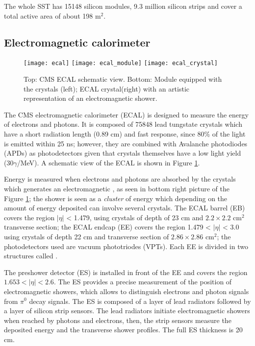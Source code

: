 The whole SST has 15148 silicon modules, 9.3 million silicon strips and cover a total active area of about 198 m$^2$. 

\subsection{Electromagnetic calorimeter}
\begin{figure}[h!]
  \centering
  \texttt{[image: ecal]}
  \texttt{[image: ecal\_module]}
  \texttt{[image: ecal\_crystal]} 
  \caption[CMS ECAL schematic view]{Top: CMS ECAL schematic view. Bottom: Module equipped with the crystals (left); ECAL crystal(right) with an artistic representation of an electromagnetic shower\cite{cms}.}
  \label{fig:ecal}
\end{figure}

The CMS electromagnetic calorimeter (ECAL) is designed to measure the energy of electrons and photons. It is composed of 75848 lead tungstate crystals which have a short radiation length (0.89 cm) and fast response, since 80\% of the light is emitted within 25 ns; however, they are combined with Avalanche photodiodes (APDs) as photodetectors given that crystals themselves have a low light yield (30$\gamma$/MeV). A schematic view of the ECAL is shown in Figure \ref{fig:ecal}.

Energy is measured when electrons and photons are absorbed by the crystals which generates an electromagnetic , as seen in bottom right picture of the Figure \ref{fig:ecal}; the shower is seen as a \textit{cluster} of energy which depending on the amount of energy deposited can involve several crystals. The ECAL barrel (EB) covers the region $|\eta|$ < 1.479, using crystals of depth of 23 cm and  $2.2\times 2.2$ cm$^2$ transverse section; the ECAL endcap (EE) covers the region 1.479 < $|\eta|$ < 3.0 using crystals of depth 22 cm and transverse section of $2.86\times2.86$ cm$^2$; the photodetectors used are vacuum phototriodes (VPTs). Each EE is divided in two structures called .

The preshower detector (ES) is installed in front of the EE and covers the region $1.653 < |\eta| < 2.6$. The ES provides a precise measurement of the position of electromagnetic showers, which allows to distinguish electrons and photon signals from $\pi^0$ decay signals. The ES is composed of a layer of lead radiators followed by a layer of silicon strip sensors. The lead radiators initiate electromagnetic showers when reached by photons and electrons, then, the strip sensors measure the deposited energy and the transverse shower profiles. The full ES thickness is 20 cm.

